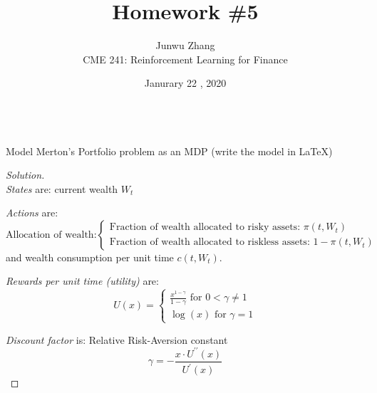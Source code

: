 \documentclass[12pt]{article}
\date{Janurary 22 , 2020}
\newenvironment{problem}[2][Problem]{\begin{trivlist}
\item[\hskip \labelsep {\bfseries #1}\hskip \labelsep {\bfseries #2.}]}{\end{trivlist}}
\newenvironment{solution}
  {\renewcommand\qedsymbol{$\blacksquare$}\begin{proof}[Solution]}
  {\end{proof}}
\begin{document}
 
\title{Homework \#5}
\author{Junwu Zhang\\ 
CME 241: Reinforcement Learning for Finance \\}
\maketitle

\begin{problem}{1}
\text{ }\\
Model Merton's Portfolio problem as an MDP (write the model in \LaTeX)
\end{problem}
\begin{solution}
\text{ }\\
\textit{States} are: current wealth $W_t$

\textit{Actions} are:
\begin{equation} 
\text{Allocation of wealth:}
\begin{cases}
\text{Fraction of wealth allocated to risky assets: } \pi(t, W_t) \\
\text{Fraction of wealth allocated to riskless assets: } 1-\pi(t, W_t)
\end{cases}
\end{equation}
and wealth consumption per unit time $c(t, W_t)$.


\textit{Rewards per unit time (utility)} are:
\begin{equation}
U(x) = 
\begin{cases}
\frac{x^{1-\gamma}}{1-\gamma} \text{ for } 0 < \gamma \neq 1 \\
\log(x) \text{ for } \gamma = 1
\end{cases} 
\end{equation}

\textit{Discount factor} is: Relative Risk-Aversion constant
\begin{equation}
	\gamma = -\frac{x \cdot U^{\prime\prime}(x)}{U^\prime(x)}
\end{equation}
\end{solution}
\end{document}
